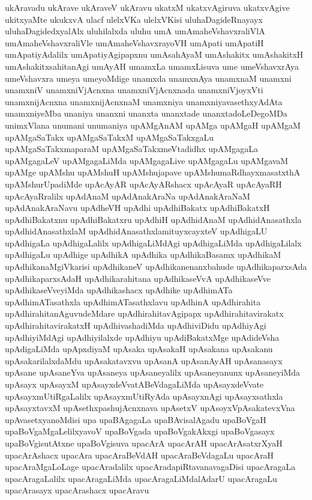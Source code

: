 {ukAravadu
ukArave
ukAraveV
ukAravu
ukatxM
ukatxvAgiruva
ukatxvAgive
ukitxyaMte
ukukxvA
ulacf
ulelxVKa
ulelxVKisi
uluhaDagideRnayayx
uluhaDagidedxyalAlx
uluhilalxda
uluhu
umA
umAmaheVshavxraliVlA
umAmaheVshavxraliVle
umAmaheVshavxrayoVH
umApati
umApatiH
umApatiyAdalilx
umApatiyAgipapxnu
umAsahAyaM
umAshakitx
umAshakitxH
umAshakitxsahitanAgi
umAyAH
umamxLa
umamxLisuva
ume
umeVshavxrAya
umeVshavxra
umeya
umeyoMdige
unamxda
unamxnAya
unamxnaM
unamxni
unamxniV
unamxniVjAcnxna
unamxniVjAcnxnada
unamxniVjoyxVti
unamxnijAcnxna
unamxnijAcnxnaM
unamxniya
unamxniyavasethxyAdAta
unamxniyeMba
unaniya
unanxni
unanxta
unanxtade
unanxtadoLeDegoMDa
unimxVlana
unumani
unumaniya
upAMgAnAM
upAMga
upAMgaH
upAMgaM
upAMgaSaTakx
upAMgaSaTakxM
upAMgaSaTakxgaLu
upAMgaSaTakxmaparaM
upAMgaSaTakxmeVtadidhx
upAMgagaLa
upAMgagaLeV
upAMgagaLiMda
upAMgagaLive
upAMgagaLu
upAMgavaM
upAMge
upAMshu
upAMshuH
upAMshujapave
upAMshumaRdhayxmasatxthA
upAMshurUpadiMde
upAcAyAR
upAcAyARshacx
upAcAyaR
upAcAyaRH
upAcAyaRralilx
upAdAnaM
upAdAnakAraNa
upAdAnakAraNaM
upAdAnakAraNavu
upAdheVH
upAdhi
upAdhiBakatx
upAdhiBakatxH
upAdhiBakatxnu
upAdhiBakatxru
upAdhiH
upAdhidAnaM
upAdhidAnasathxla
upAdhidAnasathxlaM
upAdhidAnasathxlamituyxcayxteV
upAdhigaLU
upAdhigaLa
upAdhigaLalilx
upAdhigaLiMdAgi
upAdhigaLiMda
upAdhigaLilalx
upAdhigaLu
upAdhige
upAdhikA
upAdhika
upAdhikaBasamx
upAdhikaM
upAdhikanaMgiVkarisi
upAdhikaneV
upAdhikanenanxbahude
upAdhikaparxsAda
upAdhikaparxsAdaH
upAdhikarahitana
upAdhikaseVvA
upAdhikaseVve
upAdhikaseVveyiMda
upAdhikashacx
upAdhike
upAdhimATa
upAdhimATasathxla
upAdhimATasathxlavu
upAdhinA
upAdhirahita
upAdhirahitanAguvudeMdare
upAdhirahitavAgipapx
upAdhirahitavirakatx
upAdhirahitavirakatxH
upAdhivashadiMda
upAdhiviDidu
upAdhiyAgi
upAdhiyiMdAgi
upAdhiyilalxde
upAdhiyu
upAdiBakatxMge
upAdideVsha
upAdigaLiMda
upApxdiyaM
upAsaka
upAsakaH
upAsakana
upAsakanu
upAsakarilalxdaMdu
upAsakatavxvu
upAsanA
upAsanAyAH
upAsanasayx
upAsane
upAsaneYva
upAsaneya
upAsaneyalilx
upAsaneyanunx
upAsaneyiMda
upAsayx
upAsayxM
upAsayxdeVvatABeVdagaLiMda
upAsayxdeVvate
upAsayxmUtiRgaLalilx
upAsayxmUtiRyAda
upAsayxnAgi
upAsayxsathxla
upAsayxtavxM
upAsethxpashujAcnxnava
upAsetxV
upAsoyxVpAsakatevxVna
upAvasetxyanoMdisi
upa
upaBAgagaLa
upaBAvisalAgadu
upaBoVgaH
upaBoVgaMgaLelilxyavoV
upaBoVgada
upaBoVgakAkxgi
upaBoVgasayx
upaBoVgisutAtxne
upaBoVgisuva
upacArA
upacArAH
upacArAsatxrXyaH
upacArAshacx
upacAra
upacAraBeVdAH
upacAraBeVdagaLu
upacAraH
upacAraMgaLoLage
upacAradalilx
upacAradapiRtavanavagaDisi
upacAragaLa
upacAragaLalilx
upacAragaLiMda
upacAragaLiMdalAdarU
upacAragaLu
upacArasayx
upacArashacx
upacAravu
}
